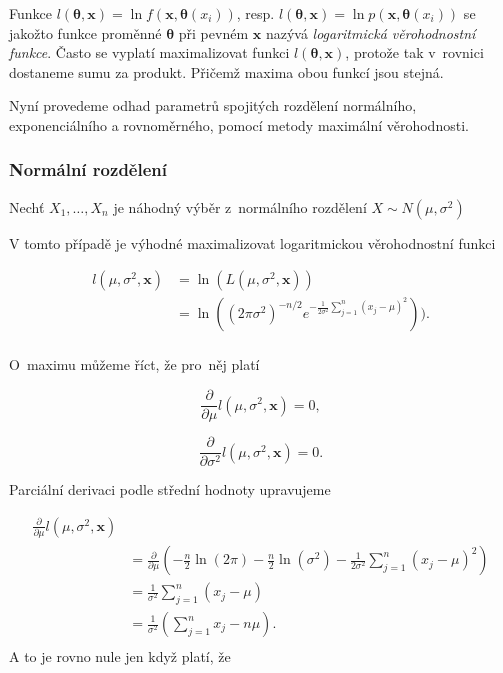 \documentclass[thesis=B,czech]{FITthesis}[2012/06/26]
\begin{document}
Funkce $l(\boldsymbol{\theta},\boldsymbol{x})=\ln f(\boldsymbol{x},\boldsymbol{\theta}(x_i))$, resp. $l(\boldsymbol{\theta},\boldsymbol{x})=\ln p(\boldsymbol{x},\boldsymbol{\theta}(x_i))$ se jakožto funkce proměnné $\boldsymbol{\theta}$ při pevném $\boldsymbol{x}$ nazývá \textit{logaritmická věrohodnostní funkce}. Často se vyplatí maximalizovat funkci $l(\boldsymbol{\theta},\boldsymbol{x})$, protože tak v~rovnici dostaneme sumu za produkt. Přičemž maxima obou funkcí jsou stejná.

Nyní provedeme odhad parametrů spojitých rozdělení normálního, exponenciálního a rovnoměrného, pomocí metody maximální věrohodnosti.

\subsubsection{Normální rozdělení}
Nechť $X_1,\dotsc,X_n$ je náhodný výběr z~normálního rozdělení $X \sim N(\mu, \sigma^2)$

V tomto případě je výhodné maximalizovat logaritmickou věrohodnostní funkci

\begin{align*}
l(\mu,\sigma^2,\boldsymbol{x}) 
& = \ln(L(\mu,\sigma^2,\boldsymbol{x}))\\
& = \ln((2\pi \sigma^2)^{-n/2}e^{-\frac{1}{2\sigma^2}\sum^{n}_{j=1}(x_j-\mu)^2})).\\
\end{align*}


\noindent O~maximu můžeme říct, že pro~něj platí

$$\frac{\partial }{\partial \mu}l(\mu,\sigma^2,\boldsymbol{x}) = 0,$$

$$\frac{\partial }{\partial \sigma^2}l(\mu,\sigma^2,\boldsymbol{x}) = 0.$$

\noindent Parciální derivaci podle střední hodnoty upravujeme

\begin{align*}
\frac{\partial }{\partial \mu}l(\mu,\sigma^2,\boldsymbol{x}) \\
&=\frac{\partial }{\partial \mu}
(-\frac{n}{2}\ln(2\pi)-\frac{n}{2}\ln(\sigma^2)-\frac{1}{2\sigma^2}
\sum^{n}_{j=1}(x_{j}-\mu)^2) \\
&=\frac{1}{\sigma^2}\sum^{n}_{j=1}(x_{j}-\mu) \\
&=\frac{1}{\sigma^2}(\sum^{n}_{j=1}x_{j}-n\mu).\\
\end{align*}
\noindent A to je rovno nule jen když platí, že
\end{document}
